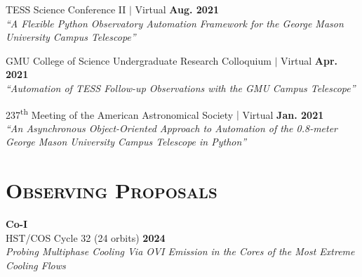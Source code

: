 \documentclass[marg, centered]{res}
\begin{document}
\begin{resume}
\begin{etaremune}[itemindent=0pt, leftmargin=19pt]
\item TESS Science Conference II $|$ Virtual \hfill \textbf{Aug. 2021}\\
{} 
\textit{``A Flexible Python Observatory Automation Framework for the George Mason University Campus Telescope''}

\item GMU College of Science Undergraduate Research Colloquium $|$ Virtual \hfill \textbf{Apr. 2021}\\
{\sc [Poster]} \textit{``Automation of TESS Follow-up Observations with the GMU Campus Telescope''}

\item 237\textsuperscript{th} Meeting of the American Astronomical Society $|$ Virtual \hfill \textbf{Jan. 2021}\\
{} \textit{``An Asynchronous Object-Oriented Approach to Automation of the 0.8-meter George Mason University Campus Telescope in Python''}


\end{etaremune}


\section{{\scshape \bfseries Observing Proposals}}
\textbf{Co-I} \\
HST/COS Cycle 32 (24 orbits) \hfill \textbf{2024} \\
\textit{Probing Multiphase Cooling Via OVI Emission in the Cores of the Most Extreme Cooling Flows}



\end{resume}
\end{document}
